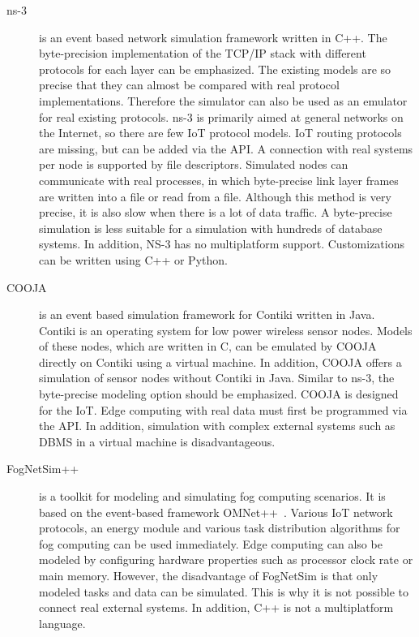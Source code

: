 \documentclass[english,version-2019-11]{uzl-thesis}
\begin{document}
\begin{description}
\item [ns-3]\cite{simulator_ns3} is an event based network simulation framework written in C++. The byte-precision implementation of the TCP/IP stack with different protocols for each layer can be emphasized. The existing models are so precise that they can almost be compared with real protocol implementations. Therefore the simulator can also be used as an emulator for real existing protocols. ns-3 is primarily aimed at general networks on the Internet, so there are few IoT protocol models. IoT routing protocols are missing, but can be added via the API. A connection with real systems per node is supported by file descriptors. Simulated nodes can communicate with real processes, in which byte-precise link layer frames are written into a file or read from a file. Although this method is very precise, it is also slow when there is a lot of data traffic. A byte-precise simulation is less suitable for a simulation with hundreds of database systems. In addition, NS-3 has no multiplatform support. Customizations can be written using C++ or Python.
\item [COOJA]\cite{simulator_cooja} is an event based simulation framework for Contiki written in Java. Contiki is an operating system for low power wireless sensor nodes. Models of these nodes, which are written in C, can be emulated by COOJA directly on Contiki using a virtual machine. In addition, COOJA offers a simulation of sensor nodes without Contiki in Java. Similar to ns-3, the byte-precise modeling option should be emphasized. COOJA is designed for the IoT. Edge computing with real data must first be programmed via the API. In addition, simulation with complex external systems such as DBMS in a virtual machine is disadvantageous.
\item [FogNetSim++]\cite{FogNetSim} is a toolkit for modeling and simulating fog computing scenarios. It is based on the event-based framework OMNet++~\cite{OMNeT}. Various IoT network protocols, an energy module and various task distribution algorithms for fog computing can be used immediately. Edge computing can also be modeled by configuring hardware properties such as processor clock rate or main memory. However, the disadvantage of FogNetSim is that only modeled tasks and data can be simulated. This is why it is not possible to connect real external systems. In addition, C++ is not a multiplatform language.

\end{description}
\end{document}
